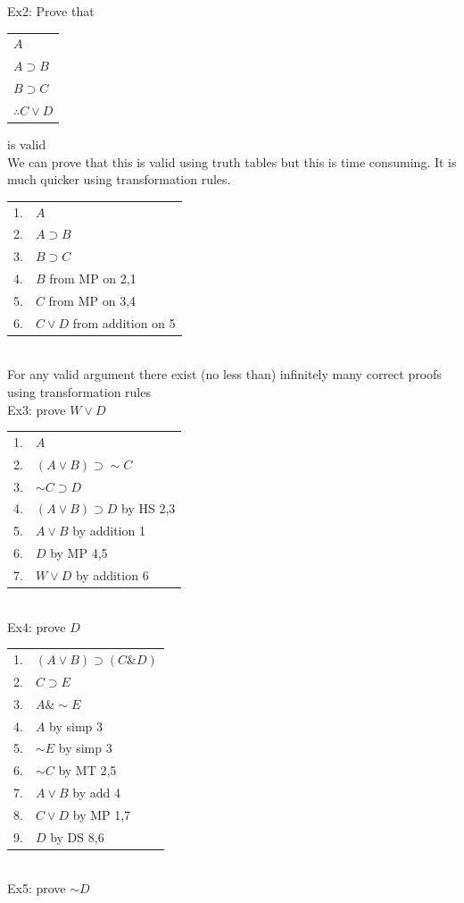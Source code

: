 \documentclass[11pt, fleqn]{article}
\newcommand{\argument}[2]{\begin{tabular}{p{#1 cm}} #2 \end{tabular}}
\begin{document}
Ex2: Prove that \argument{2}{$A$\\ $A\supset B$\\ $B\supset C$\\ \hline $\therefore C\vee D$} is valid\\
We can prove that this is valid using truth tables but this is time consuming. It is much quicker using transformation rules.\\
\begin{tabular}{cl}
    1. & $A$\\
    2. & $A\supset B$\\
    3. & $B\supset C$\\
    \hline
    4. & $B$ from MP on 2,1\\
    5. & $C$ from MP on 3,4\\
    6. & $C\vee D$ from addition on 5
\end{tabular}\\
For any valid argument there exist (no less than) infinitely many correct proofs using transformation rules\\
Ex3: prove $W\vee D$\\
\begin{tabular}{cl}
    1. & $A$\\
    2. & $(A\vee B)\supset \sim C$\\
    3. & $\sim C \supset D$\\
    \hline
    4. & $(A\vee B)\supset D$ by HS 2,3\\
    5. & $A\vee B$ by addition 1\\
    6. & $D$ by MP 4,5\\
    7. & $W\vee D$ by addition 6
\end{tabular}\\
Ex4: prove $D$\\
\begin{tabular}{cl}
    1. & $(A\vee B)\supset(C\& D)$\\
    2. & $C\supset E$\\
    3. & $A\&\sim E$\\
    \hline
    4. & $A$ by simp 3\\
    5. & $\sim E$ by simp 3\\
    6. & $\sim C$ by MT 2,5\\
    7. & $A\vee B$ by add 4\\
    8. & $C\vee D$ by MP 1,7\\
    9. & $D$ by DS 8,6
\end{tabular}\\
Ex5: prove $\sim D$\\
\end{document}
